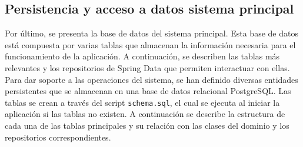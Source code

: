 \subsection{Persistencia y acceso a datos sistema principal}
Por último, se presenta la base de datos del sistema principal. Esta base de datos está compuesta por varias tablas que almacenan la información necesaria para el funcionamiento de la aplicación. A continuación, se describen las tablas más relevantes y los repositorios de Spring Data que permiten interactuar con ellas.
Para dar soporte a las operaciones del sistema, se han definido diversas entidades persistentes que se almacenan en una base de datos relacional PostgreSQL. Las tablas se crean a través del script \texttt{schema.sql}, el cual se ejecuta al iniciar la aplicación si las tablas no existen. A continuación se describe la estructura de cada una de las tablas principales y su relación con las clases del dominio y los repositorios correspondientes.


